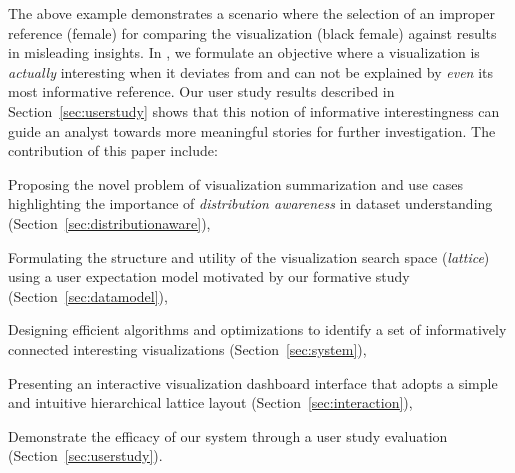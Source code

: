 The above example demonstrates a scenario where the selection of an improper reference (female) for comparing the visualization (black female) against results in misleading insights. In \system, we formulate an objective where a visualization is \emph{actually} interesting when it deviates from and can not be explained by \emph{even} its most informative reference. %
Our user study results described in Section~\ref{sec:userstudy} shows that this notion of informative interestingness can guide an analyst towards more meaningful stories for further investigation. The contribution of this paper include:
\begin{denselist}
\item Proposing the novel problem of visualization summarization and use cases highlighting the importance of \textit{distribution awareness} in dataset understanding (Section~\ref{sec:distributionaware}), %
\item Formulating the structure and utility of the visualization search space (\emph{lattice}) using a user expectation model motivated by our formative study (Section~\ref{sec:datamodel}),
\item Designing efficient algorithms and optimizations to identify a set of informatively connected interesting visualizations (Section~\ref{sec:system}),
\item Presenting an interactive visualization dashboard interface that adopts a simple and intuitive hierarchical lattice layout (Section~\ref{sec:interaction}),
\item Demonstrate the efficacy of our system through a user study evaluation (Section~\ref{sec:userstudy}).
\end{denselist}

